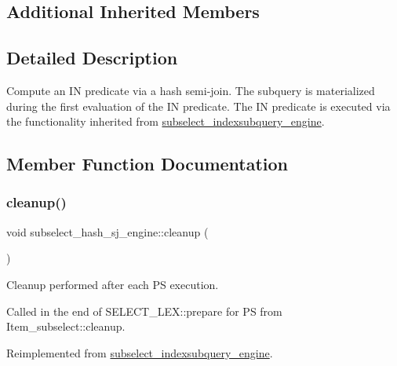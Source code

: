 \subsection*{Additional Inherited Members}


\subsection{Detailed Description}
Compute an IN predicate via a hash semi-\/join. The subquery is materialized during the first evaluation of the IN predicate. The IN predicate is executed via the functionality inherited from \mbox{\hyperlink{classsubselect__indexsubquery__engine}{subselect\+\_\+indexsubquery\+\_\+engine}}. 

\subsection{Member Function Documentation}
\mbox{\label{classsubselect__hash__sj__engine_a2543ad3f7c4cd6ab5e774d6c4eb9ef64}} 
\subsubsection{\texorpdfstring{cleanup()}{cleanup()}}
{\footnotesize\ttfamily void subselect\+\_\+hash\+\_\+sj\+\_\+engine\+::cleanup (\begin{DoxyParamCaption}{ }\end{DoxyParamCaption})\hspace{0.3cm}{\ttfamily [virtual]}}

Cleanup performed after each PS execution.

Called in the end of S\+E\+L\+E\+C\+T\+\_\+\+L\+E\+X\+::prepare for PS from Item\+\_\+subselect\+::cleanup. 

Reimplemented from \mbox{\hyperlink{classsubselect__indexsubquery__engine_a185f036d8ce8517de313c2b796b4b060}{subselect\+\_\+indexsubquery\+\_\+engine}}.

\mbox{\label{classsubselect__hash__sj__engine_a96da55efcf5b1945df7d53dcc41d6499}} 
